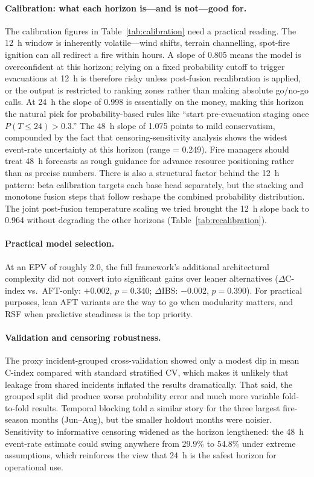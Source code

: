 \documentclass[fire,article,submit,pdftex]{../Definitions/mdpi}
\begin{document}
\paragraph{Calibration: what each horizon is---and is not---good for.}
The calibration figures in Table~\ref{tab:calibration} need a practical reading.
The 12~h window is inherently volatile---wind shifts, terrain channelling, spot-fire ignition can all redirect a fire within hours. A slope of 0.805 means the model is overconfident at this horizon; relying on a fixed probability cutoff to trigger evacuations at 12~h is therefore risky unless post-fusion recalibration is applied, or the output is restricted to ranking zones rather than making absolute go/no-go calls.
At 24~h the slope of 0.998 is essentially on the money, making this horizon the natural pick for probability-based rules like ``start pre-evacuation staging once $P(T \leq 24) > 0.3$.''
The 48~h slope of 1.075 points to mild conservatism, compounded by the fact that censoring-sensitivity analysis shows the widest event-rate uncertainty at this horizon (range = 0.249). Fire managers should treat 48~h forecasts as rough guidance for advance resource positioning rather than as precise numbers.
There is also a structural factor behind the 12~h pattern: beta calibration targets each base head separately, but the stacking and monotone fusion steps that follow reshape the combined probability distribution. The joint post-fusion temperature scaling we tried brought the 12~h slope back to 0.964 without degrading the other horizons (Table~\ref{tab:recalibration}).

\paragraph{Practical model selection.}
At an EPV of roughly 2.0, the full framework's additional architectural complexity did not convert into significant gains over leaner alternatives ($\Delta$C-index vs.\ AFT-only: $+0.002$, $p = 0.340$; $\Delta$IBS: $-0.002$, $p = 0.390$).
For practical purposes, lean AFT variants are the way to go when modularity matters, and RSF when predictive steadiness is the top priority.

\paragraph{Validation and censoring robustness.}
The proxy incident-grouped cross-validation showed only a modest dip in mean C-index compared with standard stratified CV, which makes it unlikely that leakage from shared incidents inflated the results dramatically. That said, the grouped split did produce worse probability error and much more variable fold-to-fold results.
Temporal blocking told a similar story for the three largest fire-season months (Jun--Aug), but the smaller holdout months were noisier.
Sensitivity to informative censoring widened as the horizon lengthened: the 48~h event-rate estimate could swing anywhere from 29.9\% to 54.8\% under extreme assumptions, which reinforces the view that 24~h is the safest horizon for operational use.
\end{document}
